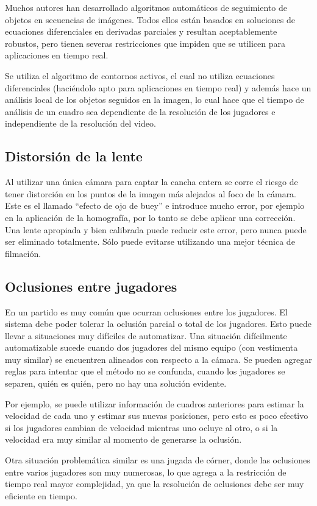 Muchos autores han desarrollado algoritmos automáticos de seguimiento de
objetos en secuencias de imágenes\cite{IFTrace, alp, local-learning, MHT-2}.
Todos ellos están basados en soluciones de ecuaciones diferenciales en
derivadas parciales y resultan aceptablemente robustos, pero tienen severas
restricciones que impiden que se utilicen para aplicaciones en tiempo real.

Se utiliza el algoritmo de contornos activos\cite{fast-level-set}, el cual no
utiliza ecuaciones diferenciales (haciéndolo apto para aplicaciones en tiempo
real) y además hace un análisis local de los objetos seguidos en la imagen, lo
cual hace que el tiempo de análisis de un cuadro sea dependiente de la
resolución de los jugadores e independiente de la resolución del video.

\subsection{Distorsión de la lente}

Al utilizar una única cámara para captar la cancha entera se corre el riesgo de
tener distorción en los puntos de la imagen más alejados al foco de la cámara.
Este es el llamado ``efecto de ojo de buey'' e introduce mucho error, por
ejemplo en la aplicación de la homografía, por lo tanto se debe aplicar una
corrección. Una lente apropiada y bien calibrada puede reducir este error, pero
nunca puede ser eliminado totalmente. Sólo puede evitarse utilizando una mejor
técnica de filmación.

\subsection{Oclusiones entre jugadores}

En un partido es muy común que ocurran oclusiones entre los jugadores. El
sistema debe poder tolerar la oclusión parcial o total de los jugadores.  Esto
puede llevar a situaciones muy difíciles de automatizar. Una situación
difícilmente automatizable sucede cuando dos jugadores del mismo equipo (con
vestimenta muy similar) se encuentren alineados con respecto a la cámara.  Se
pueden agregar reglas para intentar que el método no se confunda, cuando los
jugadores se separen, quién es quién, pero no hay una solución evidente.

Por ejemplo, se puede utilizar información de cuadros anteriores para estimar
la velocidad de cada uno y estimar sus nuevas posiciones, pero esto es poco
efectivo si los jugadores cambian de velocidad mientras uno ocluye al otro, o
si la velocidad era muy similar al momento de generarse la oclusión.

Otra situación problemática similar es una jugada de córner, donde las
oclusiones entre varios jugadores son muy numerosas, lo que agrega a la
restricción de tiempo real mayor complejidad, ya que la resolución de
oclusiones debe ser muy eficiente en tiempo.

